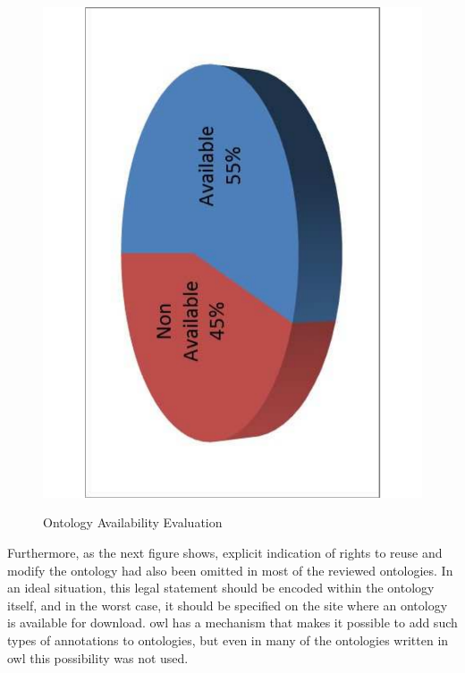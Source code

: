 \begin{figure}
	\begin{center}
		\includegraphics[scale=0.4, angle=-90]{figure-chapterIV/fig4-3.pdf}\\
		\caption{Ontology Availability Evaluation}
		\label{figure4-3}
	\end{center}
\end{figure}



Furthermore, as the next figure shows, explicit indication of rights to reuse and modify the ontology had also been omitted in most of the reviewed ontologies. In an ideal situation, this legal statement should be encoded within the ontology itself, and in the worst case, it should be specified on the site where an ontology is available for download. \gls{owl} has a mechanism that makes it possible to add such types of annotations to ontologies, but even in many of the ontologies written in \gls{owl} this possibility was not used.

